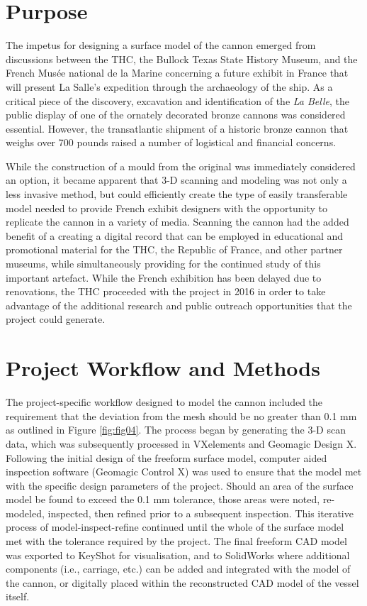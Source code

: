 \documentclass[review]{elsarticle}
\begin{document}
\section*{Purpose}

The impetus for designing a surface model of the cannon emerged from discussions between the THC, the Bullock Texas State History Museum, and the French Musée national de la Marine concerning a future exhibit in France that will present La Salle's expedition through the archaeology of the ship. As a critical piece of the discovery, excavation and identification of the \textit{La Belle}, the public display of one of the ornately decorated bronze cannons was considered essential. However, the transatlantic shipment of a historic bronze cannon that weighs over 700 pounds raised a number of logistical and financial concerns.

While the construction of a mould from the original was immediately considered an option, it became apparent that 3-D scanning and modeling was not only a less invasive method, but could efficiently create the type of easily transferable model needed to provide French exhibit designers with the opportunity to replicate the cannon in a variety of media. Scanning the cannon had the added benefit of a creating a digital record that can be employed in educational and promotional material for the THC, the Republic of France, and other partner museums, while simultaneously providing for the continued study of this important artefact. While the French exhibition has been delayed due to renovations, the THC proceeded with the project in 2016 in order to take advantage of the additional research and public outreach opportunities that the project could generate.

\section*{Project Workflow and Methods}

The project-specific workflow designed to model the cannon included the requirement that the deviation from the mesh should be no greater than 0.1 mm as outlined in Figure \ref{fig:fig04}. The process began by generating the 3-D scan data, which was subsequently processed in VXelements and Geomagic Design X. Following the initial design of the freeform surface model, computer aided inspection software (Geomagic Control X) was used to ensure that the model met with the specific design parameters of the project. Should an area of the surface model be found to exceed the 0.1 mm tolerance, those areas were noted, re-modeled, inspected, then refined prior to a subsequent inspection. This iterative process of model-inspect-refine continued until the whole of the surface model met with the tolerance required by the project. The final freeform CAD model was exported to KeyShot for visualisation, and to SolidWorks where additional components (i.e., carriage, etc.) can be added and integrated with the model of the cannon, or digitally placed within the reconstructed CAD model of the vessel itself.
\end{document}
